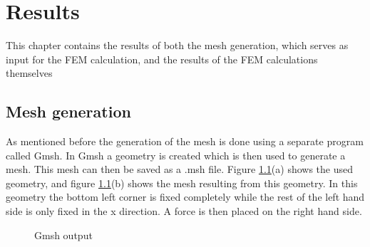 \chapter{Results}
This chapter contains the results of both the mesh generation, which serves as input for the FEM calculation, and the results of the FEM calculations themselves

\section{Mesh generation}
As mentioned before the generation of the mesh is done using a separate program called Gmsh. In Gmsh a geometry is created which is then used to generate a mesh. This mesh can then be saved as a .msh file. Figure \ref{Gmsh}(a) shows the used geometry, and figure \ref{Gmsh}(b) shows the mesh resulting from this geometry. In this geometry the bottom left corner is fixed completely while the rest of the left hand side is only fixed in the x direction. A force is then placed on the right hand side. 

 \begin{figure}[H]
 	\begin{center}
    \caption{Gmsh output}
    \label{Gmsh}
	\end{center}
\end{figure}
%

